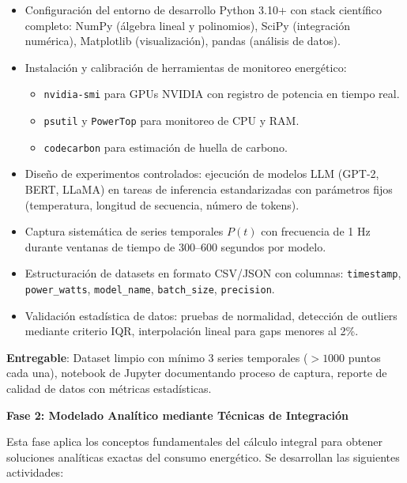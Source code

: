 \begin{itemize}
    \item Configuración del entorno de desarrollo Python 3.10+ con stack científico completo: NumPy (álgebra lineal y polinomios), SciPy (integración numérica), Matplotlib (visualización), pandas (análisis de datos).
    \item Instalación y calibración de herramientas de monitoreo energético:
    \begin{itemize}
        \item \texttt{nvidia-smi} para GPUs NVIDIA con registro de potencia en tiempo real.
        \item \texttt{psutil} y \texttt{PowerTop} para monitoreo de CPU y RAM.
        \item \texttt{codecarbon} para estimación de huella de carbono.
    \end{itemize}
    \item Diseño de experimentos controlados: ejecución de modelos LLM (GPT-2, BERT, LLaMA) en tareas de inferencia estandarizadas con parámetros fijos (temperatura, longitud de secuencia, número de tokens).
    \item Captura sistemática de series temporales $P(t)$ con frecuencia de 1 Hz durante ventanas de tiempo de 300--600 segundos por modelo.
    \item Estructuración de datasets en formato CSV/JSON con columnas: \texttt{timestamp}, \texttt{power\_watts}, \texttt{model\_name}, \texttt{batch\_size}, \texttt{precision}.
    \item Validación estadística de datos: pruebas de normalidad, detección de outliers mediante criterio IQR, interpolación lineal para gaps menores al 2\%.
\end{itemize}

\textbf{Entregable}: Dataset limpio con mínimo 3 series temporales ($> 1000$ puntos cada una), notebook de Jupyter documentando proceso de captura, reporte de calidad de datos con métricas estadísticas.

\textbf{Fase 2: Modelado Analítico mediante Técnicas de Integración}

Esta fase aplica los conceptos fundamentales del cálculo integral para obtener soluciones analíticas exactas del consumo energético. Se desarrollan las siguientes actividades:

